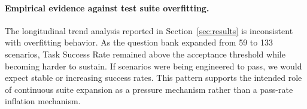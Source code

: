 \paragraph{Empirical evidence against test suite overfitting.}
The longitudinal trend analysis reported in Section~\ref{sec:results} is inconsistent with overfitting behavior. As the question bank expanded from 59 to 133 scenarios, Task Success Rate remained above the acceptance threshold while becoming harder to sustain. If scenarios were being engineered to pass, we would expect stable or increasing success rates. This pattern supports the intended role of continuous suite expansion as a pressure mechanism rather than a pass-rate inflation mechanism.
